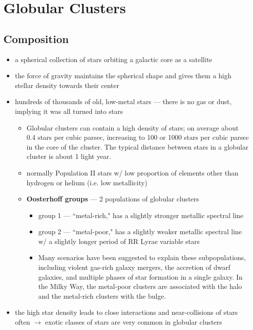 \section{Globular Clusters}
\subsection{Composition}
\begin{itemize}[noitemsep]
	\item a spherical collection of stars orbiting a galactic core as a satellite
	\item the force of gravity maintains the spherical shape and gives them a high stellar density towards their center
	\item hundreds of thousands of old, low-metal stars --- there is no gas or dust, implying it was all turned into stars
		\begin{itemize}[noitemsep]
			\item Globular clusters can contain a high density of stars; on average about 0.4 stars per cubic parsec, increasing to 100 or 1000 stars per cubic parsec in the core of the cluster. The typical distance between stars in a globular cluster is about 1 light year.
			\item normally Population II stars w/ low proportion of elements other than hydrogen or helium (i.e. low metallicity)
			\item \textbf{Oosterhoff groups} --- 2 populations of globular clusters
				\begin{itemize}[noitemsep]
					\item group 1 --- ``metal-rich," has a slightly stronger metallic spectral line
					\item group 2 --- ``metal-poor," has a slightly weaker metallic spectral line w/ a slightly longer period of RR Lyrae variable stars
					\item  Many scenarios have been suggested to explain these subpopulations, including violent gas-rich galaxy mergers, the accretion of dwarf galaxies, and multiple phases of star formation in a single galaxy. In the Milky Way, the metal-poor clusters are associated with the halo and the metal-rich clusters with the bulge.
				\end{itemize}
		\end{itemize}
	\item the high star density leads to close interactions and near-collisions of stars often $\rightarrow$ exotic classes of stars are very common in globular clusters
		\begin{itemize}[noitemsep]

\end{itemize}
\end{itemize}
